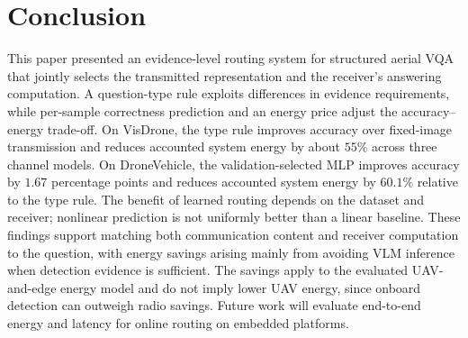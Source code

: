 \section{Conclusion}\label{sec:conc}
This paper presented an evidence-level routing system for structured
aerial VQA that jointly selects the transmitted representation and
the receiver's answering computation. A question-type rule exploits
differences in evidence requirements, while per-sample correctness
prediction and an energy price adjust the accuracy--energy trade-off.
On VisDrone, the type rule improves accuracy over fixed-image
transmission and reduces accounted system energy by about $55\%$
across three channel models. On DroneVehicle, the validation-selected
MLP improves accuracy by $1.67$ percentage points and reduces
accounted system energy by $60.1\%$ relative to the type rule.
The benefit of learned routing depends on the dataset and receiver;
nonlinear prediction is not uniformly better than a linear baseline.
These findings support matching both communication content and
receiver computation to the question, with energy savings arising
mainly from avoiding VLM inference when detection evidence is sufficient.
The savings apply to the evaluated UAV-and-edge energy model and
do not imply lower UAV energy, since onboard detection can outweigh
radio savings. Future work will evaluate end-to-end energy and
latency for online routing on embedded platforms.
